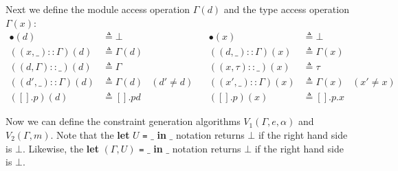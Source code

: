 \documentclass{article}
\theoremstyle{definition}
\newcommand*{\cons}{::}
\newcommand*{\modid}{d}
\begin{document}
Next we define the module access operation $\Gamma(\modid)$ and the type access operation $\Gamma(x)$:
\begin{align*}
	\bullet(\modid)                   & \triangleq\bot           &            &  & \bullet(x)                  & \triangleq\bot                   \\
	((x,\_)\cons\Gamma)(\modid)       & \triangleq\Gamma(\modid) &            &  & ((\modid,\_)\cons\Gamma)(x) & \triangleq\Gamma(x)              \\
	((\modid,\Gamma)\cons\_)(\modid)  & \triangleq\Gamma         &            &  & ((x,\tau)\cons\_)(x)        & \triangleq\tau                   \\
	((\modid',\_)\cons\Gamma)(\modid) & \triangleq\Gamma(\modid) & (d'\neq d) &  & ((x',\_)\cons\Gamma)(x)     & \triangleq\Gamma(x) & (x'\neq x) \\
	([].p)(\modid)                    & \triangleq[].pd          &            &  & ([].p)(x)                   & \triangleq[].p.x
\end{align*}

Now we can define the constraint generation algorithms $V_1(\Gamma,e,\alpha)$ and $V_2(\Gamma,m)$.
Note that the \textbf{let} $U$ \texttt{=} $\_$ \textbf{in} $\_$ notation returns $\bot$ if the right hand side is $\bot$.
Likewise, the \textbf{let} $(\Gamma,U)$ \texttt{=} $\_$ \textbf{in} $\_$ notation returns $\bot$ if the right hand side is $\bot$.
\end{document}

